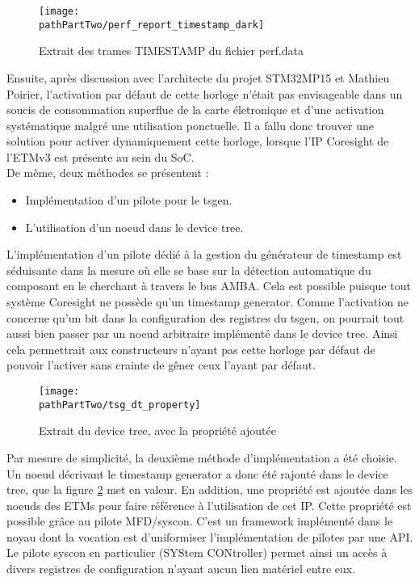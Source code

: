 \begin{figure}[H]
	\begin{center}
		\texttt{[image: \\pathPartTwo/perf\_report\_timestamp\_dark]}
		\caption{Extrait des trames TIMESTAMP du fichier perf.data}
	    \label{fig:perf_report_timestamp}
	\end{center}
\end{figure}

Ensuite, après discussion avec l'architecte du projet STM32MP15 et Mathieu
Poirier, l'activation par défaut de cette horloge n'était pas envisageable
dans un soucis de consommation superflue de la carte életronique et d'une
activation systématique malgré une utilisation ponctuelle. Il a fallu donc
trouver une solution pour activer dynamiquement cette horloge, lorsque l'IP
Coresight de l'ETMv3 est présente au sein du SoC. \\

De même, deux méthodes se présentent :

\begin{itemize}[label=\textbullet]
	\item Implémentation d'un pilote pour le tsgen.
	\item L'utilisation d'un noeud dans le device tree. \\
\end{itemize}

L'implémentation d'un pilote dédié à la gestion du générateur de timestamp est
séduisante dans la mesure où elle se base sur la détection automatique du
composant en le cherchant à travers le bus AMBA. Cela est possible puisque
tout système Coresight ne possède qu'un timestamp generator. Comme
l'activation ne concerne qu'un bit dans la configuration des registres du
tsgen, on pourrait tout aussi bien passer par un noeud arbitraire implémenté
dans le device tree. Ainsi cela permettrait aux constructeurs n'ayant pas
cette horloge par défaut de pouvoir l'activer sans crainte de gêner ceux
l'ayant par défaut. \\

\begin{figure}[H]
	\begin{center}
		\texttt{[image: \\pathPartTwo/tsg\_dt\_property]}
		\caption{Extrait du device tree, avec la propriété ajoutée}
	    \label{fig:tsg_dt_property}
	\end{center}
\end{figure}

Par mesure de simplicité, la deuxième méthode d'implémentation a été choisie.
Un noeud décrivant le timestamp generator a donc été rajouté dans le device
tree, que la figure \ref{fig:tsg_dt_property} met en valeur. En addition, une
propriété est ajoutée dans les noeuds des ETMs pour faire référence à
l'utilisation de cet IP. Cette propriété est possible grâce au pilote
MFD/syscon. C'est un framework implémenté dans le noyau dont la vocation est
d'uniformiser l'implémentation de pilotes par une API. Le pilote syscon en
particulier (SYStem CONtroller) permet ainsi un accès à divers registres de
configuration n'ayant aucun lien matériel entre eux. \\

